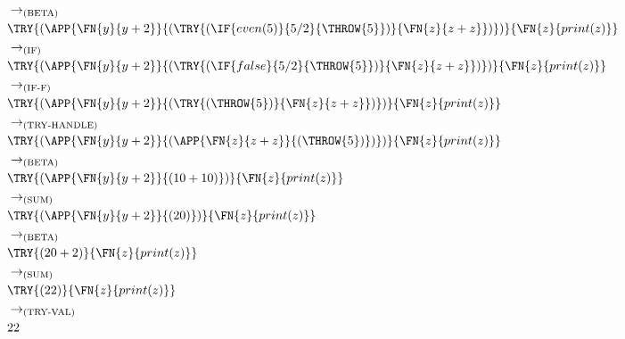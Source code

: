 \begin{itemize}
\begin{align*}
		       & \to_{\text{(BETA)}}                                                                              \\
		       & \TRY{(\APP{\FN{y}{y+2}}{(\TRY{(\IF{even(5)}{5/2}{\THROW{5}})}{\FN{z}{z+z}})})}{\FN{z}{print(z)}} \\
		       & \to_{\text{(IF)}}                                                                                \\
		       & \TRY{(\APP{\FN{y}{y+2}}{(\TRY{(\IF{false}{5/2}{\THROW{5}})}{\FN{z}{z+z}})})}{\FN{z}{print(z)}}   \\
		       & \to_{\text{(IF-F)}}                                                                              \\
		       & \TRY{(\APP{\FN{y}{y+2}}{(\TRY{(\THROW{5})}{\FN{z}{z+z}})})}{\FN{z}{print(z)}}                    \\
		       & \to_{\text{(TRY-HANDLE)}}                                                                        \\
		       & \TRY{(\APP{\FN{y}{y+2}}{(\APP{\FN{z}{z+z}}{(\THROW{5})})})}{\FN{z}{print(z)}}                    \\
		       & \to_{\text{(BETA)}}                                                                              \\
		       & \TRY{(\APP{\FN{y}{y+2}}{(10 + 10)})}{\FN{z}{print(z)}}                                           \\
		       & \to_{\text{(SUM)}}                                                                               \\
		       & \TRY{(\APP{\FN{y}{y+2}}{(20)})}{\FN{z}{print(z)}}                                                \\
		       & \to_{\text{(BETA)}}                                                                              \\
		       & \TRY{(20 + 2)}{\FN{z}{print(z)}}                                                                 \\
		       & \to_{\text{(SUM)}}                                                                               \\
		       & \TRY{(22)}{\FN{z}{print(z)}}                                                                     \\
		       & \to_{\text{(TRY-VAL)}}                                                                           \\
		       & 22
	      \end{align*}

\end{itemize}
